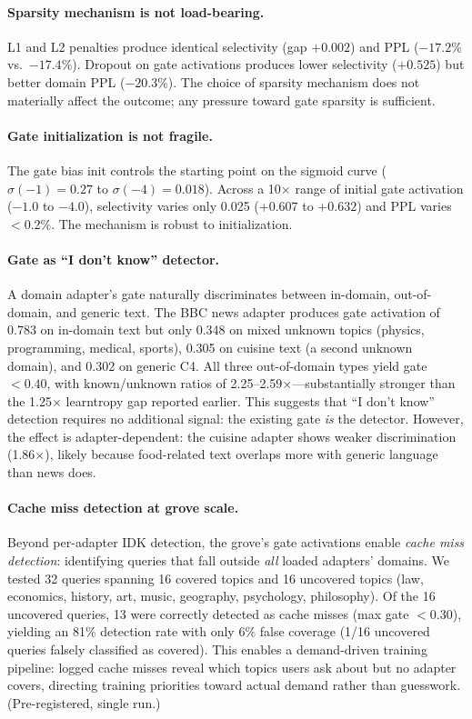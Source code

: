 \documentclass{article}
\begin{document}
\paragraph{Sparsity mechanism is not load-bearing.}
L1 and L2 penalties produce identical selectivity (gap $+0.002$) and PPL
($-17.2\%$ vs.\ $-17.4\%$). Dropout on gate activations produces lower
selectivity ($+0.525$) but better domain PPL ($-20.3\%$). The choice of
sparsity mechanism does not materially affect the outcome; any pressure toward
gate sparsity is sufficient.

\paragraph{Gate initialization is not fragile.}
The gate bias init controls the starting point on the sigmoid curve
($\sigma(-1) = 0.27$ to $\sigma(-4) = 0.018$). Across a 10$\times$ range
of initial gate activation ($-1.0$ to $-4.0$), selectivity varies only 0.025
($+0.607$ to $+0.632$) and PPL varies $<$0.2\%. The mechanism is robust to
initialization.

\paragraph{Gate as ``I don't know'' detector.}
A domain adapter's gate naturally discriminates between in-domain, out-of-domain,
and generic text. The BBC news adapter produces gate activation of 0.783 on
in-domain text but only 0.348 on mixed unknown topics (physics, programming,
medical, sports), 0.305 on cuisine text (a second unknown domain), and 0.302 on
generic C4. All three out-of-domain types yield gate $<0.40$, with known/unknown
ratios of 2.25--2.59$\times$---substantially stronger than the 1.25$\times$
learntropy gap reported earlier. This suggests that ``I don't know'' detection
requires no additional signal: the existing gate \emph{is} the detector.
However, the effect is adapter-dependent: the cuisine adapter shows weaker
discrimination (1.86$\times$), likely because food-related text overlaps more
with generic language than news does.

\paragraph{Cache miss detection at grove scale.}
Beyond per-adapter IDK detection, the grove's gate activations enable
\emph{cache miss detection}: identifying queries that fall outside
\emph{all} loaded adapters' domains. We tested 32 queries spanning 16
covered topics and 16 uncovered topics (law, economics, history, art,
music, geography, psychology, philosophy). Of the 16 uncovered queries,
13 were correctly detected as cache misses (max gate $<0.30$), yielding
an 81\% detection rate with only 6\% false coverage (1/16 uncovered
queries falsely classified as covered). This enables a demand-driven
training pipeline: logged cache misses reveal which topics users ask
about but no adapter covers, directing training priorities toward actual
demand rather than guesswork. (Pre-registered, single run.)
\end{document}
